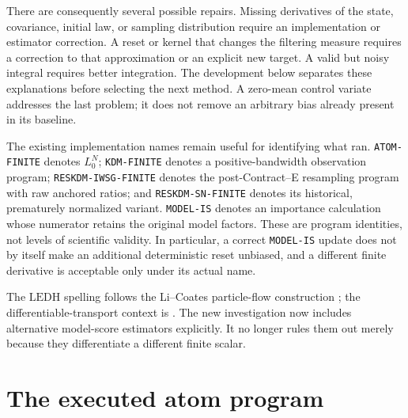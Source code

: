 \documentclass[11pt]{article}
\newcommand{\LEDH}{\ensuremath{\mathrm{LEDH}}}
\begin{document}
There are consequently several possible repairs. Missing derivatives of the
state, covariance, initial law, or sampling distribution require an
implementation or estimator correction. A reset or kernel that changes the
filtering measure requires a correction to that approximation or an explicit
new target. A valid but noisy integral requires better integration. The
development below separates these explanations before selecting the next
method. A zero-mean control variate addresses the last problem; it does not
remove an arbitrary bias already present in its baseline.

The existing implementation names remain useful for identifying what ran.
\texttt{ATOM-FINITE} denotes $L_0^N$; \texttt{KDM-FINITE} denotes a
positive-bandwidth observation program; \texttt{RESKDM-IWSG-FINITE} denotes
the post-Contract--E resampling program with raw anchored ratios; and
\texttt{RESKDM-SN-FINITE} denotes its historical, prematurely normalized
variant. \texttt{MODEL-IS} denotes an importance calculation whose numerator
retains the original model factors. These are program identities, not levels
of scientific validity. In particular, a correct \texttt{MODEL-IS} update
does not by itself make an additional deterministic reset unbiased, and a
different finite derivative is acceptable only under its actual name.

The \LEDH{} spelling follows the Li--Coates particle-flow construction
\citep{li2017particle}; the differentiable-transport context is
\citet{corenflos2021differentiable}. The new investigation now includes
alternative model-score estimators explicitly. It no longer rules them out
merely because they differentiate a different finite scalar.


\section{The executed atom program}
\label{sec:atom}
\end{document}

